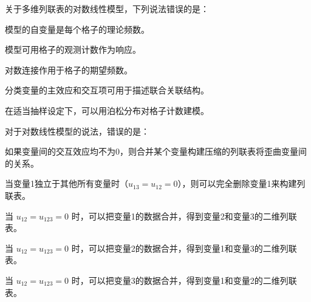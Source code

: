 \par\addvspace{8pt}\noindent\begin{minipage}{\linewidth}


关于多维列联表的对数线性模型，下列说法错误的是：


\begin{choices}

\item 模型的自变量是每个格子的理论频数。

\item 模型可用格子的观测计数作为响应。

\item 对数连接作用于格子的期望频数。

\item 分类变量的主效应和交互项可用于描述联合关联结构。

\item 在适当抽样设定下，可以用泊松分布对格子计数建模。

\end{choices}

\end{minipage}\par\vspace{5pt}

\par\addvspace{8pt}\noindent\begin{minipage}{\linewidth}


对于对数线性模型的说法，错误的是：


\begin{choices}

\item 如果变量间的交互效应均不为0，则合并某个变量构建压缩的列联表将歪曲变量间的关系。

\item 当变量1独立于其他所有变量时（\(u_{13}=u_{12}=0\)），则可以完全删除变量1来构建列联表。

\item 当 \(u_{12}=u_{123}=0\) 时，可以把变量1的数据合并，得到变量2和变量3的二维列联表。

\item 当 \(u_{12}=u_{123}=0\) 时，可以把变量2的数据合并，得到变量1和变量3的二维列联表。

\item 当 \(u_{12}=u_{123}=0\) 时，可以把变量3的数据合并，得到变量1和变量2的二维列联表。

\end{choices}

\end{minipage}\par\vspace{5pt}

